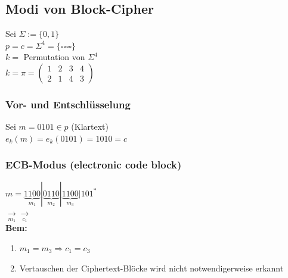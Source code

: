 \documentclass[10pt]{article}
\newcommand{\Bold}[1]{\textbf{#1}} %
\newcommand{\Ra}{\Rightarrow}
\newcommand{\Array}[2]{\left(\begin{array}{#1}#2\end{array}\right)} %
\newcommand{\Unten}[2]{\underset{#1}{#2}} %
\begin{document}
\subsection{Modi von Block-Cipher}
Sei $\Sigma:=\{0,1\}$\\ 
$p=c=\Sigma^4=\{\square\square\square\square\}$\\
$k=$ Permutation von $\Sigma^4$\\
$k=\pi=\Array{cccc}{1&2&3&4\\2&1&4&3}$\\
\subsubsection*{Vor- und Entschlüsselung}
Sei $m=0101\in p$ (Klartext)\\ 
$e_k(m)=e_k(0101)=1010=c$
\subsubsection{ECB-Modus (electronic code block)}
 $m=\underbrace{1100}_{m_1}|\underbrace{0110}_{m_2}|\underbrace{1100}_{m_3}|101^*$\\
 $\Unten{m_1}{\longrightarrow}$$\Unten{c_1}{\longrightarrow}$\\
 \Bold{Bem:} \begin{enumerate}
              \item $m_1=m_3\Ra c_1=c_3$
              \item Vertauschen der Ciphertext-Blöcke wird nicht notwendigerweise erkannt
             \end{enumerate}
\end{document}
